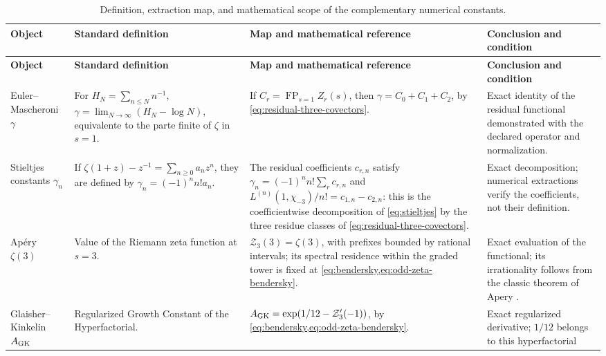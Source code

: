 \begingroup
\small
\fontsize{10pt}{11.2pt}\selectfont
\setlength{\LTpre}{0.5\baselineskip}
\setlength{\LTpost}{0.5\baselineskip}
\begin{longtable}{@{}>{\raggedright\arraybackslash}p{}
                    >{\raggedright\arraybackslash}p{}
                    >{\raggedright\arraybackslash}p{}
                    >{\raggedright\arraybackslash}p{}@{}}
\caption{Definition, extraction map, and mathematical scope of the
complementary numerical constants.}
\label{p3-83-c44-s1:tab:constantes-operadores-ontologia-rev11}\\
\toprule
\textbf{Object} & \textbf{Standard definition} &
\textbf{Map and mathematical reference} & \textbf{Conclusion and condition}\\
\midrule
\endfirsthead
\toprule
\textbf{Object} & \textbf{Standard definition} &
\textbf{Map and mathematical reference} & \textbf{Conclusion and condition}\\
\midrule
\endhead
Euler--Mascheroni \(\gamma\) &
For \(H_N=\sum_{n\leq N}n^{-1}\),
\(\gamma=\lim_{N\to\infty}(H_N-\log N)\), equivalente to the parte finite of
\(\zeta\) in \(s=1\). &
If \(C_r=\operatorname*{FP}_{s=1}Z_r(s)\), then
\(\gamma=C_0+C_1+C_2\), by
\eqref{eq:residual-three-covectors}. &
Exact identity of the residual functional demonstrated with the declared
operator and normalization.\\
Stieltjes constants \(\gamma_n\) &
If \(\zeta(1+z)-z^{-1}=\sum_{n\geq0}a_nz^n\), they are defined by
\(\gamma_n=(-1)^n n!a_n\). &
The residual coefficients \(c_{r,n}\) satisfy \(\gamma_n=(-1)^n n!\sum_r c_{r,n}\) and
\(L^{(n)}(1,\chi_{-3})/n!=c_{1,n}-c_{2,n}\): this is the coefficientwise decomposition of
\eqref{eq:stieltjes} by the three residue classes of \eqref{eq:residual-three-covectors}. &
Exact decomposition; numerical extractions verify the
coefficients, not their definition.\\
Ap\'ery \(\zeta(3)\) &
Value of the Riemann zeta function at \(s=3\). &
\(\mathcal Z_3(3)=\zeta(3)\), with prefixes bounded by rational intervals;
its spectral residence within the graded tower is fixed at
\cref{eq:bendersky,eq:odd-zeta-bendersky}. &
Exact evaluation of the functional; its irrationality follows from the
classic theorem of Apery \cite{Apery1979}.\\
Glaisher--Kinkelin \(A_{\rm GK}\) &
Regularized Growth Constant of the Hyperfactorial. &
\(A_{\rm GK}=\exp(1/12-\mathcal Z_3'(-1))\), by
\cref{eq:bendersky,eq:odd-zeta-bendersky}. &
Exact regularized derivative; \(1/12\) belongs to this hyperfactorial

\end{longtable}
